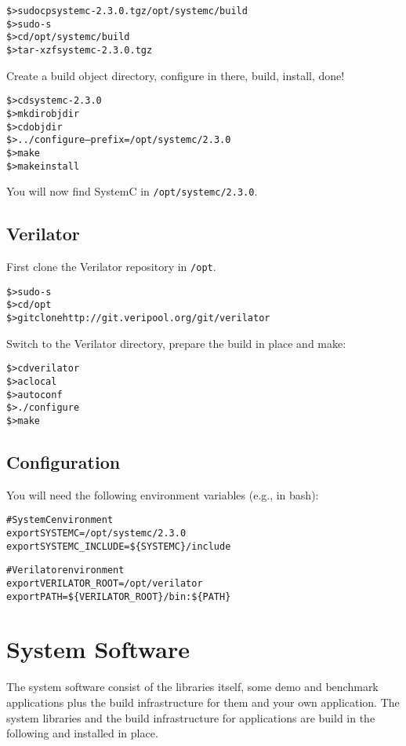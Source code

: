 \begin{alltt}
\$> sudo cp systemc-2.3.0.tgz /opt/systemc/build
\$> sudo -s
\$> cd /opt/systemc/build
\$> tar -xzf systemc-2.3.0.tgz
\end{alltt}

Create a build object directory, configure in there, build, install,
done!

\begin{alltt}
\$> cd systemc-2.3.0
\$> mkdir objdir
\$> cd objdir
\$> ../configure --prefix=/opt/systemc/2.3.0
\$> make
\$> make install
\end{alltt}

You will now find SystemC in \verb|/opt/systemc/2.3.0|.

\subsection{Verilator}

First clone the Verilator repository in \verb|/opt|.

\begin{alltt}
\$> sudo -s
\$> cd /opt
\$> git clone http://git.veripool.org/git/verilator
\end{alltt}

Switch to the Verilator directory, prepare the build in place and make:

\begin{alltt}
\$> cd verilator
\$> aclocal
\$> autoconf
\$> ./configure
\$> make
\end{alltt}

\subsection{Configuration}

You will need the following environment variables (e.g., in bash):

\begin{alltt}
# SystemC environment
export SYSTEMC=/opt/systemc/2.3.0
export SYSTEMC_INCLUDE=\$\{SYSTEMC\}/include

# Verilator environment
export VERILATOR\_ROOT=/opt/verilator
export PATH=\$\{VERILATOR_ROOT\}/bin:\$\{PATH\}
\end{alltt}

\section{System Software}

The system software consist of the libraries itself, some demo and
benchmark applications plus the build infrastructure for them and your
own application. The system libraries and the build infrastructure for
applications are build in the following and installed in place.

